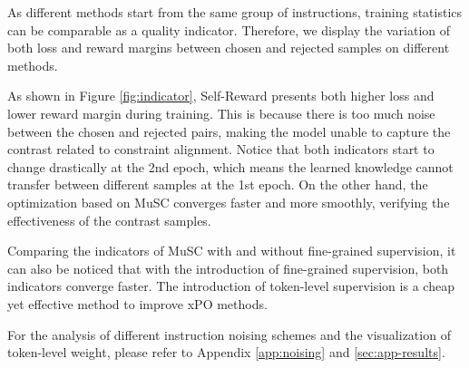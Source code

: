 As different methods start from the same group of instructions, training statistics can be comparable as a quality indicator. Therefore, we display the variation of both loss and reward margins between chosen and rejected samples on different methods. 


As shown in Figure \ref{fig:indicator}, Self-Reward presents both higher loss and lower reward margin during training. This is because there is too much noise between the chosen and rejected pairs, making the model unable to capture the contrast related to constraint alignment. Notice that both indicators start to change drastically at the 2nd epoch, which means the learned knowledge cannot transfer between different samples at the 1st epoch. On the other hand, the optimization based on MuSC converges faster and more smoothly, verifying the effectiveness of the contrast samples.

Comparing the indicators of MuSC with and without fine-grained supervision, it can also be noticed that with the introduction of fine-grained supervision, both indicators converge faster. The introduction of token-level supervision is a cheap yet effective method to improve xPO methods.

For the analysis of different instruction noising schemes and the visualization of token-level weight, please refer to Appendix \ref{app:noising} and \ref{sec:app-results}.